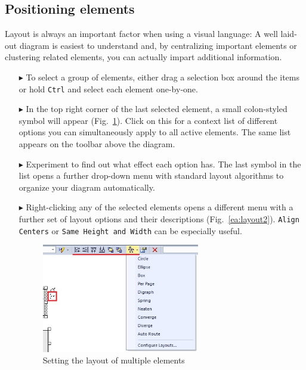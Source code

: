 \subsection{Positioning elements}

Layout is always an important factor when using a visual language:
A well laid-out diagram is easiest to understand and, by centralizing important
elements or clustering related elements, you can actually impart additional information.

\begin{enumerate}
\item[$\blacktriangleright$] To select a group of elements, either drag a selection box around the items or hold \texttt{Ctrl} and select each element
one-by-one.

\item[$\blacktriangleright$] In the top right corner of the last selected element, a small colon-styled symbol will appear (Fig.~\ref{ea:layout1}). Click on
this for a context list of different options you can simultaneously apply to all active elements. The same list appears on the toolbar above the
diagram. 

\item[$\blacktriangleright$] Experiment to find out what effect each option has. The last symbol in the list opens a further drop-down menu with standard layout
algorithms to organize your diagram automatically.

\item[$\blacktriangleright$] Right-clicking any of the selected elements opens a different menu with a further set of layout options and their descriptions
(Fig.~\ref{ea:layout2}). \texttt{Align Centers} or \texttt{Same Height and Width} can be especially useful.

\begin{figure}[htbp]
\begin{center} 
  \includegraphics[width=0.65\textwidth]{ea_layoutElementsCommonContext}
  \caption{Setting the layout of multiple elements}  
  \label{ea:layout1}
\end{center}
\end{figure}


\end{enumerate}
